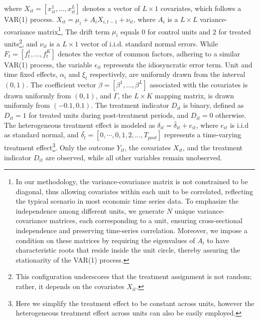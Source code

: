 \documentclass[12pt]{article}
\begin{document}
where $X_{it} = [x_{it}^1, \ldots, x_{it}^{L}]$ denotes a vector of $L \times 1$ covariates, which follows a VAR(1) process. $X_{it} = \mu_i + A_i X_{i,t-1} + \nu_{it}$, where $A_i$ is a $ L \times L$ variance-covariance matrix\footnote{In our methodology, the variance-covariance matrix is not constrained to be diagonal, thus allowing covariates within each unit to be correlated, reflecting the typical scenario in most economic time series data. To emphasize the independence among different units, we generate $N$ unique variance-covariance matrices, each corresponding to a unit, ensuring cross-sectional independence and preserving time-series correlation. Moreover, we impose a condition on these matrices by requiring the eigenvalues of $A_i$ to have characteristic roots that reside inside the unit circle, thereby assuring the stationarity of the VAR(1) process.}, The drift term $\mu_i$ equals 0 for control units and 2 for treated units\footnote{This configuration underscores that the treatment assignment is not random; rather, it depends on the covariates $X_{it}$.}, and $\nu_{it}$ is a $L \times 1$ vector of i.i.d. standard normal errors. While $F_t = [f_t^1, \ldots, f_t^K]$ denotes the vector of common factors, adhering to a similar VAR(1) process, the variable $\epsilon_{it}$ represents the idiosyncratic error term. Unit and time fixed effects, $\alpha_i$ and $\xi_{t}$ respectively, are uniformly drawn from the interval $(0,1)$. The coefficient vector $\beta = [\beta^1, \ldots, \beta^{L}]$ associated with the covariates is drawn uniformly from $(0,1)$, and $\Gamma$, the $L \times K$ mapping matrix, is drawn uniformly from $(-0.1, 0.1)$. The treatment indicator $D_{it}$ is binary, defined as $D_{it} = 1$ for treated units during post-treatment periods, and $D_{it} = 0$ otherwise. The heterogeneous treatment effect is modeled as $\delta_{it} = \bar{\delta}_{it} + e_{it}$, where $e_{it}$ is i.i.d as standard normal, and $\bar{\delta_t} = [0, \cdots, 0, 1,2,\ldots, T_{post}]$ represents a time-varying treatment effect\footnote{Here we simplify the treatment effect to be constant across units, however the heterogeneous treatment effect across units can also be easily employed.}. Only the outcome $Y_{it}$, the covariates $X_{it}$, and the treatment indicator $D_{it}$ are observed, while all other variables remain unobserved.
\end{document}
